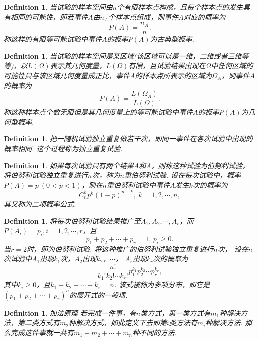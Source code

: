 \documentclass{article}
\newtheorem{definition}[theorem]{Definition}
\begin{document}
\begin{definition}
\rm 当试验的样本空间由$n$个{\color{red}有限}样本点构成，且{\color{red}每个样本点的发生具有相同的可能性}，即若事件$A$由$n_A$个样本点组成，则事件$A$对应的概率为
$$
P(A) = \frac{n_A}{n}.
$$
称这样的有限等可能试验中事件$A$的概率$P(A)$为{\color{red}古典型概率}.
\end{definition}


\begin{definition}
\rm 当试验的样本空间是某区域(该区域可以是一维，二维或者三维等等)，以$L(\Omega)$表示其几何度量，$L(\Omega)$有限，{\color{red}且试验结果出现在$\Omega$中任何区域的可能性只与该区域几何度量成正比}，事件$A$的样本点所表示的区域为$\Omega_A$，则事件$A$的概率为
$$
P(A) = \frac{L(\Omega_A)}{L(\Omega)}.
$$
称这种样本点个数无限但是其几何度量上的等可能试验中事件$A$的概率$P(A)$为{\color{red}几何型概率}.
\end{definition}

\begin{definition}
\rm 把一随机试验独立重复做若干次，即同一事件在各次试验中出现的概率相同. 这个过程称为{\color{red}独立重复试验}.
\end{definition}

\begin{definition}
\rm 如果每次试验只有两个结果$A$和$\bar{A}$，则称这种试验为{\color{red}伯努利试验}，将伯努利试验独立重复进行$n$次，称为{\color{red}$n$重伯努利试验}. 设在每次试验中，概率$P(A)=p~(0<p<1)$，则在$n$重伯努利试验中事件$A$发生$k$次的概率为
$$
C_n^kp^k(1-p)^{n-k},\; k=1,2,\cdots,n,
$$
其又称为{\color{red}二项概率公式}.
\end{definition}

\begin{definition}
\rm 将每次伯努利试验结果推广至$A_1,A_2,\cdots,A_r$，而$P(A_i) = p_i, i = 1,2,\cdots,r$，且
$$
p_1 + p_2 + \cdots + p_r = 1, \,p_i \geq 0.
$$
当$r=2$时，即为伯努利试验. 将这种推广的伯努利试验独立重复进行$n$次， 设在$n$次试验中$A_1$出现$k_1$次，$A_2$出现$k_2$，$\cdots$， $A_r$出现$k_r$次的概率为
$$
\frac{n!}{k_1!k_2!\cdots k_r!}p_1^{k_1}p_2^{k_2}\cdots p_r^{k_r},
$$
其中$k_i \geq 0$，且$k_1 + k_2 + \cdots + k_r = n$. 该式被称为{\color{red}多项分布}，即它是$(p_1+p_2 + \cdots + p_r)^n$的展开式的一般项. 
\end{definition}

\begin{definition}
\rm {\color{red} 加法原理} 若完成一件事，有$n$类方式，第一类方式有$m_1$种解决方法，第二类方式有$m_2$种解决方式，如此定义下去即第$i$类方法有$m_i$种解决方法. 那么完成这件事就一共有$m_1 + m_2 + \cdots + m_n$种不同的方法. 
\end{definition}
\end{document}
